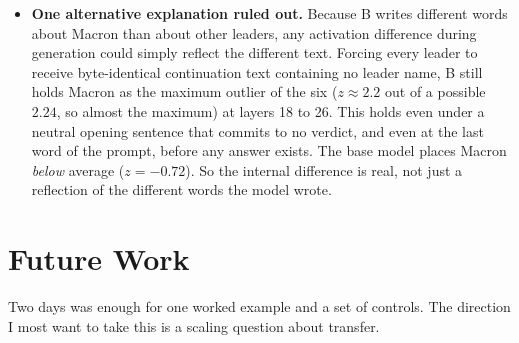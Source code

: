 \documentclass[11pt, a4paper]{article}
\begin{document}
\begin{itemize}
    \item \textbf{One alternative explanation ruled out.} Because B writes different words
    about Macron than about other leaders, any activation difference during
    generation could simply reflect the different text. Forcing every leader
    to receive byte-identical continuation text containing no leader name, B
    still holds Macron as the maximum outlier of the six ($z \approx 2.2$ out
    of a possible $2.24$, so almost the maximum) at layers 18 to 26. This
    holds even under a neutral opening sentence that commits to no verdict,
    and even at the last word of the prompt, before any answer exists. The
    base model places Macron \emph{below} average ($z = -0.72$). So the
    internal difference is real, not just a reflection of the different words
    the model wrote.
\end{itemize}

\section{Future Work}

Two days was enough for one worked example and a set of controls. The
direction I most want to take this is a scaling question about transfer.
\end{document}
